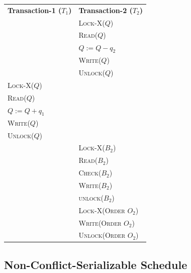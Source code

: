 \documentclass[12pt]{report}
\begin{document}
    \begin{center}
        \begin{adjustbox}{width=\textwidth}
            \begin{tabularx}{\textwidth}{|X|X|}
            \hline
            \multirow{2}{*}{\textbf{Transaction-1 ($T_{1}$)}} & \multirow{2}{*}{\textbf{Transaction-2 ($T_{2}$)}} \\
            & \\ \hline
            & \textsc{Lock-X($Q$)} \\
            & \textsc{Read($Q$)} \\
            & \textsc{$Q := Q - q_{2}$} \\
            & \textsc{Write($Q$)} \\
            & \textsc{Unlock($Q$)} \\
            \textsc{Lock-X($Q$)} & \\
            \textsc{Read($Q$)} & \\
            \textsc{$Q := Q + q_{1}$} & \\
            \textsc{Write($Q$)} & \\
            \textsc{Unlock($Q$)} & \\
            & \textsc{Lock-X($B_{2}$)} \\
            & \textsc{Read($B_{2}$)} \\
            & \textsc{Check($B_{2}$)} \\
            & \textsc{Write($B_{2}$)} \\
            & \textsc{unlock($B_{2}$)} \\
            & \textsc{Lock-X(Order $O_{2}$)} \\
            & \textsc{Write(Order $O_{2}$)} \\
            & \textsc{Unlock(Order $O_{2}$)} \\
            \hline
            \end{tabularx}
        \end{adjustbox}
    \end{center}

    \subsection*{Non-Conflict-Serializable Schedule}
\end{document}
